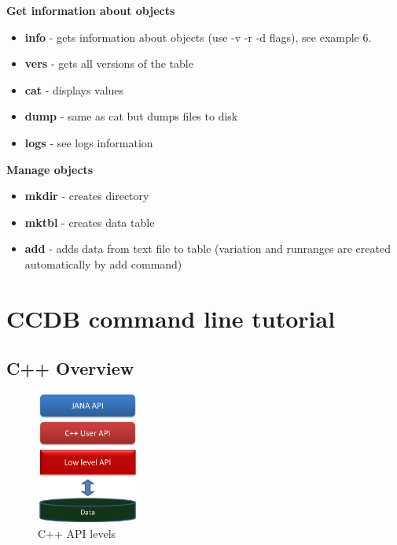 \documentclass{article}
\begin{document}
\textbf{Get information about objects}
\begin{itemize}
  \item \textbf{info} - gets information about objects (use -v -r -d flags), see example 6.
  \item \textbf{vers} - gets all versions of the table
  \item \textbf{cat}  - displays values
  \item \textbf{dump} - same as cat but dumps files to disk
  \item \textbf{logs} - see logs information
\end{itemize}


\textbf{Manage objects}
\begin{itemize}
  \item \textbf{mkdir} - creates directory
  \item \textbf{mktbl} - creates data table
  \item \textbf{add} - adds data from text file to table
        (variation and runranges are created automatically by add command)
\end{itemize}

\newpage
\section{CCDB command line tutorial}\label{sec:cpp}


\subsection{C++ Overview}

\begin{figure}[h]
  \centering
  \includegraphics[width=0.3\textwidth]{pics/cpp_api_levels}
  \caption{C++ API levels}
  \label{pic:cpp_api_levels}
\end{figure}
\end{document}
